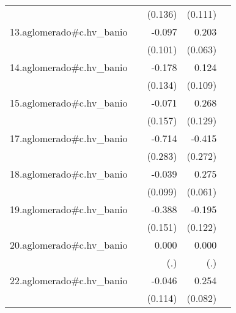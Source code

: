 {\begin{longtable}{l*{4}{D{.}{.}{-1}}}
            &                     &     (0.136)         &     (0.111)         &                     \\
\addlinespace
13.aglomerado#c.hv\_banio&                     &      -0.097         &       0.203\sym{**} &                     \\
            &                     &     (0.101)         &     (0.063)         &                     \\
\addlinespace
14.aglomerado#c.hv\_banio&                     &      -0.178         &       0.124         &                     \\
            &                     &     (0.134)         &     (0.109)         &                     \\
\addlinespace
15.aglomerado#c.hv\_banio&                     &      -0.071         &       0.268\sym{*}  &                     \\
            &                     &     (0.157)         &     (0.129)         &                     \\
\addlinespace
17.aglomerado#c.hv\_banio&                     &      -0.714\sym{*}  &      -0.415         &                     \\
            &                     &     (0.283)         &     (0.272)         &                     \\
\addlinespace
18.aglomerado#c.hv\_banio&                     &      -0.039         &       0.275\sym{***}&                     \\
            &                     &     (0.099)         &     (0.061)         &                     \\
\addlinespace
19.aglomerado#c.hv\_banio&                     &      -0.388\sym{*}  &      -0.195         &                     \\
            &                     &     (0.151)         &     (0.122)         &                     \\
\addlinespace
20.aglomerado#c.hv\_banio&                     &       0.000         &       0.000         &                     \\
            &                     &         (.)         &         (.)         &                     \\
\addlinespace
22.aglomerado#c.hv\_banio&                     &      -0.046         &       0.254\sym{**} &                     \\
            &                     &     (0.114)         &     (0.082)         &                     \\

\end{longtable}}
